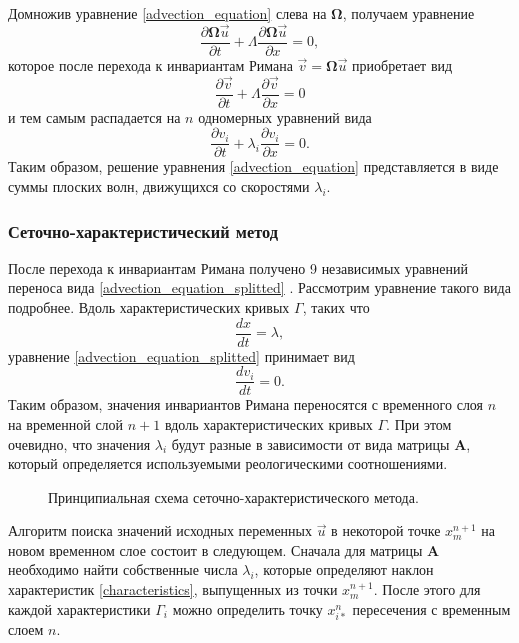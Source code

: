 Домножив уравнение \eqref{advection_equation} слева на $\mathbf\Omega$, получаем уравнение
\begin{equation}
\frac{\partial{\mathbf\Omega{\vec u}}}{\partial t}+
\Lambda\frac{\partial{\mathbf\Omega{\vec u}}}{\partial x}=0,
\end{equation}
которое после перехода к инвариантам Римана ${\vec v}=\mathbf\Omega{\vec u}$ приобретает вид
\begin{equation}
\frac{\partial{\vec v}}{\partial t}+
\Lambda\frac{\partial{\vec v}}{\partial x}=0
\end{equation}
и тем самым распадается на $n$ одномерных уравнений вида
\begin{equation}
\frac{\partial{v_i}}{\partial t}+\lambda_i\frac{\partial{v_i}}{\partial x}=0.
\label{advection_equation_splitted}
\end{equation}
Таким образом, решение уравнения \eqref{advection_equation} представляется в виде
суммы плоских волн, движущихся со скоростями $\lambda_i$.


\subsubsection{Сеточно-характеристический метод}
\label{sec:gcm_method_idea}

После перехода к инвариантам Римана получено 9 независимых уравнений переноса вида \eqref{advection_equation_splitted} \cite{h}. Рассмотрим уравнение такого вида подробнее. Вдоль характеристических кривых $\Gamma$, таких что
\begin{equation}
\label{characteristics}
\frac{dx}{dt} = \lambda,
\end{equation}
уравнение \eqref{advection_equation_splitted} принимает вид 
\begin{equation}
\label{characteristic_equation}
\frac{dv_i}{dt} = 0.
\end{equation}
Таким образом, значения инвариантов Римана переносятся с временного слоя $n$ на временной слой $n+1$ вдоль характеристических кривых $\Gamma$. При этом очевидно, что значения $\lambda_i$ будут разные в зависимости от вида матрицы $\mathbf A$, который определяется используемыми реологическими соотношениями.

\begin{figure}[h]
\caption{Принципиальная схема сеточно-характеристического метода.}
\end{figure}

Алгоритм поиска значений исходных переменных $\vec u$ в некоторой точке $x_m^{n+1}$ на новом временном слое состоит в следующем. Сначала для матрицы $\mathbf A$ необходимо найти собственные числа $\lambda_i$, которые определяют наклон характеристик \eqref{characteristics}, выпущенных из точки $x_m^{n+1}$. После этого для каждой характеристики $\Gamma_i$ можно определить точку $x_{i*}^n$ пересечения с временным слоем $n$.

